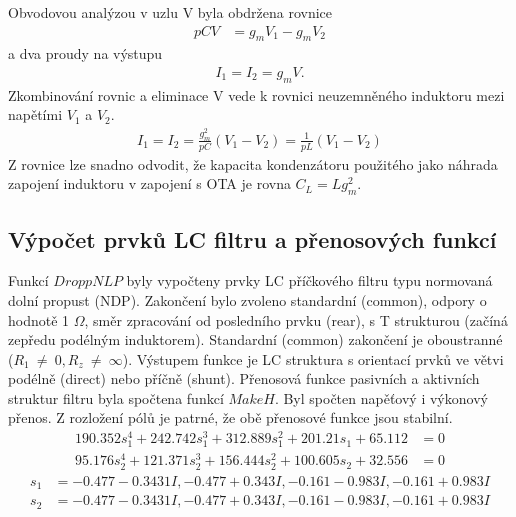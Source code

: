 Obvodovou analýzou v uzlu V byla obdržena rovnice
\begin{align}
pCV &= g_mV_1 - g_mV_2
\end{align}
a dva proudy na výstupu
\begin{align}
I_1 = I_2 = g_mV.
\end{align}
Zkombinování rovnic a eliminace V vede k rovnici neuzemněného induktoru mezi napětími $V_1$ a $V_2$.
\begin{align}
I_1 = I_2 = \frac{g_m^2}{pC}(V_1 - V_2) = \frac{1}{pL}(V_1 - V_2)
\end{align}
Z rovnice lze snadno odvodit, že kapacita kondenzátoru použitého jako náhrada zapojení induktoru v zapojení s OTA je rovna $C_L = L g_m ^2$. \\
\subsection{Výpočet prvků LC filtru a přenosových funkcí}\label{s:VYP}
\noindent Funkcí $DroppNLP$ byly vypočteny prvky LC příčkového filtru typu normovaná dolní propust (NDP). Zakončení bylo zvoleno standardní (common), odpory o hodnotě 1 $\Omega$, směr zpracování od posledního prvku (rear), s T strukturou (začíná zepředu podélným induktorem). Standardní (common) zakončení je oboustranné ($R_1~\neq~0, R_z~\neq~\infty$). Výstupem funkce je LC struktura s orientací prvků ve větvi podélně (direct) nebo příčně (shunt).
\noindent Přenosová funkce pasivních a aktivních struktur filtru byla spočtena funkcí $MakeH$. Byl spočten  napěťový i výkonový přenos. Z rozložení pólů je patrné, že obě přenosové funkce jsou stabilní.
\begin{align}
190.352s_1^4 + 242.742s_1^3 + 312.889s_1^2 + 201.21s_1 + 65.112 &= 0 \\
95.176s_2^4 + 121.371s_2^3 + 156.444s_2^2 + 100.605s_2 + 32.556 &= 0
\end{align}
\begin{align}
s_1 &= {-0.477 - 0.3431 I}, {-0.477 + 0.343 I}, {-0.161 - 0.983 I}, {-0.161 + 0.983 I}\\
s_2 &= {-0.477 - 0.3431 I}, {-0.477 + 0.343 I}, {-0.161 - 0.983 I}, {-0.161+ 0.983 I}
\end{align}
